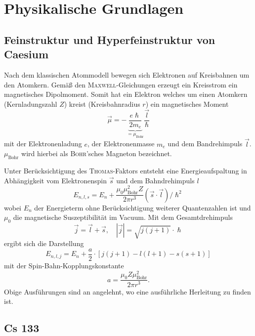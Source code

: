\documentclass[../bericht.tex]{subfiles}
\begin{document}
  \chapter{Physikalische Grundlagen}

    \section{Feinstruktur und Hyperfeinstruktur von Caesium}
    \label{sec:feinstruktur}

      Nach dem klassischen Atommodell bewegen sich Elektronen auf Kreisbahnen um den Atomkern. Gemäß den \textsc{Maxwell}-Gleichungen erzeugt ein Kreisstrom ein magnetisches Dipolmoment. Somit hat ein Elektron welches um einen Atomkern (Kernladungszahl $Z$) kreist (Kreisbahnradius $r$) ein magnetisches Moment
      \begin{equation*}
        \vec{\mu}=-\underbrace{\frac{e\hslash}{2m_e}}_{=\mu_\mathrm{Bohr}}\frac{\vec{l}}{\hslash}
      \end{equation*}
      mit der Elektronenladung $e$, der Elektronenmasse $m_e$ und dem Bandrehimpuls $\vec{l}$. $\mu_\mathrm{Bohr}$ wird hierbei als \textsc{Bohr}'sches  Magneton bezeichnet.

      Unter Berücksichtigung des \textsc{Thomas}-Faktors entsteht eine Energieaufspaltung in Abhängigkeit vom Elektronenspin $\vec{s}$ und dem Bahndrehimpuls $l$
      \begin{equation*}
        E_{n,l,s}=E_n + \frac{\mu_0 \mu_\mathrm{Bohr}^2 Z}{2 \pi r^3}\left(\vec{s}\cdot \vec{l}\right)/\hslash^2
      \end{equation*}
      wobei $E_n$ der Energieterm ohne Berücksichtigung weiterer Quantenzahlen ist und $\mu_0$ die magnetische Suszeptibilität im Vacuum. Mit dem Gesamtdrehimpuls
      \begin{equation*}
        \vec{j}=\vec{l}+\vec{s},\quad |\vec{j}|=\sqrt{j(j+1)}\cdot \hslash
      \end{equation*}
      ergibt sich die Darstellung
      \begin{equation}
        E_{n,l,j}=E_n+\frac{a}{2}\cdot \left[j(j+1)-l(l+1)-s(s+1)\right]
      \end{equation}
      mit der Spin-Bahn-Kopplungskonstante
      \begin{equation*}
        a=\frac{\mu_0 Z\mu_\mathrm{Bohr}^2}{2\pi r^3}.
      \end{equation*}
      Obige Ausführungen sind an \cite{dem:exp3-feinstruktur} angelehnt, wo eine ausführliche Herleitung zu finden ist.

    \section{Cs 133}
\end{document}
